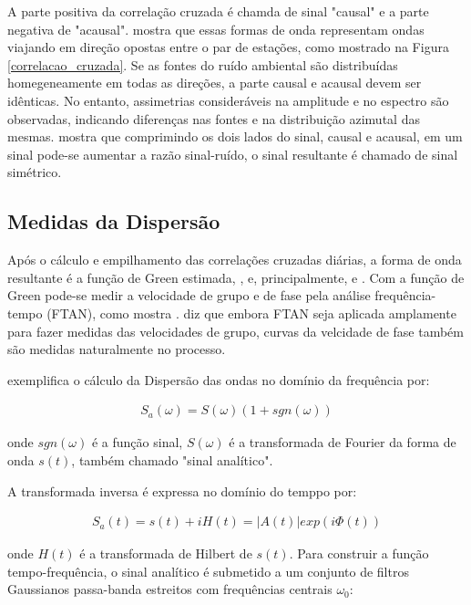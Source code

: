 A parte positiva da correlação cruzada é chamda de sinal "causal" e a parte negativa de "acausal". \cite{bensen_processing_2007} mostra que essas formas de onda representam ondas viajando em direção opostas entre o par de estações, como mostrado na Figura \ref{correlacao_cruzada}. Se as fontes do ruído ambiental são distribuídas homegeneamente em todas as direções, a parte causal e acausal devem ser idênticas. No entanto, assimetrias consideráveis na amplitude e no espectro são observadas, indicando diferenças nas fontes e na distribuição azimutal das mesmas. \cite{bensen_processing_2007} mostra que comprimindo os dois lados do sinal, causal e acausal, em um sinal pode-se aumentar a razão sinal-ruído, o sinal resultante é chamado de sinal simétrico.

\subsection{Medidas da Dispersão}

Após o cálculo e empilhamento das correlações cruzadas diárias, a forma de onda resultante é a função de Green estimada, \cite{campillo_long-range_2003}, \cite{shapiro_emergence_2004} e, principalmente, \cite{wapenaar_retrieving_2004} e \cite{bensen_processing_2007}. Com a função de Green pode-se medir a velocidade de grupo e de fase pela análise frequência-tempo (FTAN), como mostra \cite{levshin_automated_2001}. \cite{bensen_processing_2007} diz que embora FTAN seja aplicada amplamente para fazer medidas das velocidades de grupo, curvas da velcidade de fase também são medidas naturalmente no processo.

\cite{bensen_processing_2007} exemplifica o cálculo da Dispersão das ondas no domínio da frequência por:

\begin{eqnarray}
S_{a}(\omega) = S(\omega)(1 + sgn(\omega))
\end{eqnarray}

onde $sgn(\omega)$ é a função sinal, $S(\omega)$ é a transformada de Fourier da forma de onda $s(t)$, também chamado "sinal analítico".

A transformada inversa é expressa no domínio do temppo por:

\begin{eqnarray}
S_{a}(t) = s(t) + iH(t) = \left | A(t) \right |exp(i\Phi(t))
\end{eqnarray}

onde $H(t)$ é a transformada de Hilbert de $s(t)$. Para construir a função tempo-frequência, o sinal analítico é submetido a um conjunto de filtros Gaussianos passa-banda estreitos com frequências centrais $\omega _{0}$:

